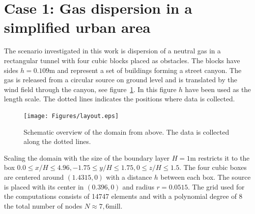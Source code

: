 \section{Case 1: Gas dispersion in a simplified urban area}
The scenario investigated in this work is dispersion of a neutral gas in a rectangular tunnel
with four cubic blocks placed as obstacles. The blocks have sides $h = 0.109$m and represent a 
set of buildings forming a street canyon. The gas is released from a circular source on 
ground level and
is translated by the wind field through the canyon, see figure~\ref{fig:layout}.
In this figure $h$ have been used as the length scale. The dotted lines
indicates the positions where data is collected.
%
\begin{figure}[h]
	\texttt{[image: Figures/layout.eps]}
	\caption{Schematic overview of the domain from above. The data is collected along the dotted lines.}
	\label{fig:layout}
\end{figure}
%

Scaling the domain with the size of the boundary layer $H =1$m restricts it to
the box $0.0\leq x/H \leq 4.96,-1.75\leq y/H \leq 1.75, 0\leq z/H \leq 1.5$.
The four cubic boxes are centered around $(1.4315,0)$ with a distance $h$ between each box.
The source is placed with its center in $(0.396,0)$ and radius $r = 0.0515$.
The grid used for the computations consists of 14747 elements and with a polynomial degree of
8 the total number of nodes $N\approx 7,6$mill. 


